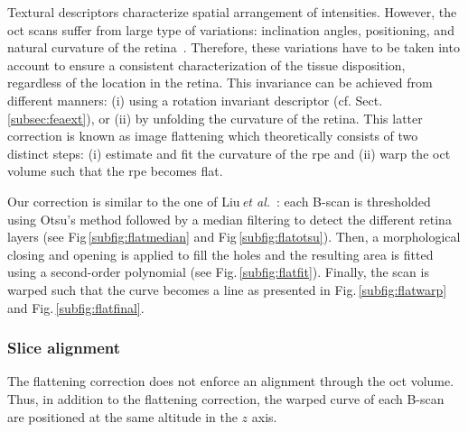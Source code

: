 Textural descriptors characterize spatial arrangement of intensities.
However, the \ac{oct} scans suffer from large type of variations: inclination angles, positioning, and natural curvature of the retina~\cite{Liu2011}.
Therefore, these variations have to be taken into account to ensure a consistent characterization of the tissue disposition, regardless of the location in the retina.
This invariance can be achieved from different manners: (i) using a rotation invariant descriptor (cf. Sect.\,\ref{subsec:feaext}), or (ii) by unfolding the curvature of the retina.
This latter correction is known as image flattening which theoretically consists of two distinct steps: (i) estimate and fit the curvature of the \ac{rpe} and (ii) warp the \ac{oct} volume such that the \ac{rpe} becomes flat.

Our correction is similar to the one of Liu\,\textit{et al.}~\cite{Liu2011}: each B-scan is thresholded using Otsu's method followed by a median filtering to detect the different retina layers (see Fig\,\ref{subfig:flatmedian} and Fig\,\ref{subfig:flatotsu}). 
Then, a morphological closing and opening is applied to fill the holes and the resulting area is fitted using a second-order polynomial (see Fig.\,\ref{subfig:flatfit}). 
Finally, the scan is warped such that the curve becomes a line as presented in Fig.\,\ref{subfig:flatwarp} and Fig.\,\ref{subfig:flatfinal}. 


\subsubsection{Slice alignment}
The flattening correction does not enforce an alignment through the \ac{oct} volume.
Thus, in addition to the flattening correction, the warped curve of each B-scan are positioned at the same altitude in the $z$ axis. 


